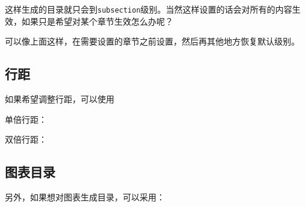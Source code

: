 \documentclass[12pt]{article}
\begin{document}
\begin{Shaded}
\begin{Highlighting}[]
\end{Highlighting}
\end{Shaded}

这样生成的目录就只会到\texttt{subsection}级别。当然这样设置的话会对所有的内容生效，如果只是希望对某个章节生效怎么办呢？

\begin{Shaded}
\begin{Highlighting}[]

\end{Highlighting}
\end{Shaded}

可以像上面这样，在需要设置的章节之前设置，然后再其他地方恢复默认级别。

\subsection{行距}\label{ux884cux8ddd}

如果希望调整行距，可以使用

\begin{Shaded}
\begin{Highlighting}[]
\end{Highlighting}
\end{Shaded}

单倍行距：

双倍行距：

\subsection{图表目录}\label{ux56feux8868ux76eeux5f55}

另外，如果想对图表生成目录，可以采用：

\begin{Shaded}
\begin{Highlighting}[]
\NormalTok{\{}\NormalTok{\}}
\NormalTok{\{}\NormalTok{\}  }
\end{Highlighting}
\end{Shaded}
\end{document}
